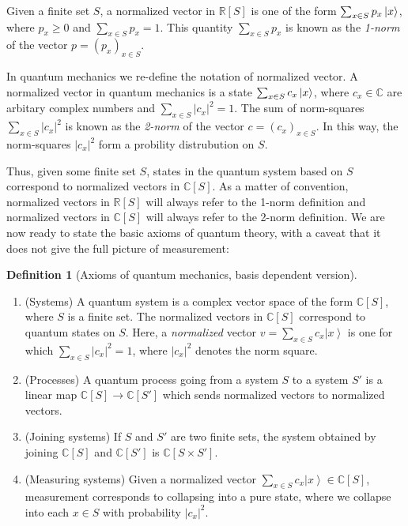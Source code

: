 \documentclass{article}
\theoremstyle{definition}
\newtheorem*{definition}{Definition}
\newcommand{\RR}{\mathbb{R}}
\newcommand{\CC}{\mathbb{C}}
\newcommand{\0}{\left|0\right>}
\newcommand{\1}{\left|1\right>}
\numberwithin{figure}{section}
\begin{document}
Given a finite set $S$, a normalized vector in $\RR[S]$ is one of the form $\sum_{x\in S}p_x \ket{x}$, where $p_x\geq 0$ and $\sum_{x\in S}p_x=1$.  This quantity $\sum_{x\in S}p_x$ is known as the \textit{1-norm} of the vector $p=(p_x)_{x\in S}$.

In quantum mechanics we re-define the notation of normalized vector. A normalized vector in quantum mechanics is a state $\sum_{x\in S}c_x \ket{x}$, where $c_x\in \CC$ are arbitary complex numbers and $\sum_{x\in S}|c_x|^2=1$. The sum of norm-squares $\sum_{x\in S}|c_x|^2$ is known as the \textit{2-norm} of the vector $c=(c_x)_{x\in S}$. In this way, the norm-squares $|c_x|^2$ form a probility distrubution on $S$.

Thus, given some finite set $S$, states in the quantum system based on $S$ correspond to normalized vectors in $\CC[S]$. As a matter of convention, normalized vectors in $\RR[S]$ will always refer to the 1-norm definition and normalized vectors in $\CC[S]$ will always refer to the 2-norm definition. We are now ready to state the basic axioms of quantum theory, with a caveat that it does not give the full picture of measurement:

\begin{definition}[Axioms of quantum mechanics, basis dependent version] $\,$

\begin{enumerate}
\item (Systems) A quantum system is a complex vector space of the form $\CC[S]$, where $S$ is a finite set. The normalized vectors in $\CC[S]$ correspond to quantum states on $S$. Here, a \textit{normalized} vector $v=\sum_{x\in S}c_x\left|x\right>$ is one for which $\sum_{x\in S}|c_x|^2=1$, where $|c_x|^2$ denotes the norm square.
\item (Processes) A quantum process going from a system $S$ to a system $S'$ is a linear map $\CC[S]\to \CC[S']$ which sends normalized vectors to normalized vectors.
\item (Joining systems) If $S$ and $S'$ are two finite sets, the system obtained by joining $\CC[S]$ and $\CC[S']$ is $\CC[S\times S']$.
\item (Measuring systems) Given a normalized vector $\sum_{x\in S}c_x \left |x\right>\in \CC[S]$, measurement corresponds to collapsing into a pure state, where we collapse into each $x\in S$ with probability $|c_x|^2$.
\end{enumerate}

\raggedleft\qedsymbol{}
\end{definition}
\end{document}
